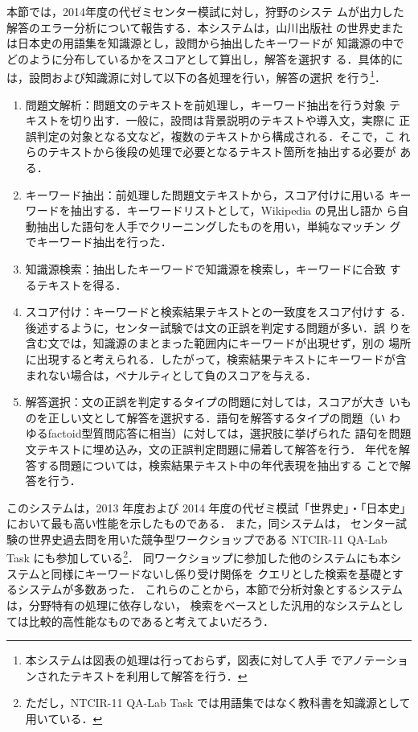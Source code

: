 \documentclass[japanese]{jnlp_1.4b}
\begin{document}
本節では，2014年度の代ゼミセンター模試に対し，狩野\cite{kano2014jsai}のシステ
ムが出力した解答のエラー分析について報告する．本システムは，山川出版社
の世界史または日本史の用語集を知識源とし，設問から抽出したキーワードが
知識源の中でどのように分布しているかをスコアとして算出し，解答を選択す
る．具体的には，設問および知識源に対して以下の各処理を行い，解答の選択
を行う\footnote{本システムは図表の処理は行っておらず，図表に対して人手
  でアノテーションされたテキストを利用して解答を行う．}．
\begin{enumerate}
\item 問題文解析：問題文のテキストを前処理し，キーワード抽出を行う対象
  テキストを切り出す．一般に，設問は背景説明のテキストや導入文，実際に
  正誤判定の対象となる文など，複数のテキストから構成される．そこで，こ
  れらのテキストから後段の処理で必要となるテキスト箇所を抽出する必要が
  ある．
\item キーワード抽出：前処理した問題文テキストから，スコア付けに用いる
  キーワードを抽出する．キーワードリストとして，Wikipedia の見出し語か
  ら自動抽出した語句を人手でクリーニングしたものを用い，単純なマッチン
  グでキーワード抽出を行った．
\item 知識源検索：抽出したキーワードで知識源を検索し，キーワードに合致
  するテキストを得る．
\item スコア付け：キーワードと検索結果テキストとの一致度をスコア付けす
  る．後述するように，センター試験では文の正誤を判定する問題が多い．誤
  りを含む文では，知識源のまとまった範囲内にキーワードが出現せず，別の
  場所に出現すると考えられる．したがって，検索結果テキストにキーワードが含
  まれない場合は，ペナルティとして負のスコアを与える．
\item 解答選択：文の正誤を判定するタイプの問題に対しては，スコアが大き
  いものを正しい文として解答を選択する．語句を解答するタイプの問題（い
    わゆるfactoid型質問応答に相当）に対しては，選択肢に挙げられた
  語句を問題文テキストに埋め込み，文の正誤判定問題に帰着して解答を行う．
  年代を解答する問題については，検索結果テキスト中の年代表現を抽出する
  ことで解答を行う．
\end{enumerate}

このシステムは，2013 年度および 2014 年度の代ゼミ模試「世界史」・「日本史」において最も高い性能を示したものである．
また，同システムは，
センター試験の世界史過去問を用いた競争型ワークショップである
NTCIR-11 QA-Lab Task \cite{Shibuki2014} にも参加している\footnote{
    ただし，NTCIR-11 QA-Lab Task では用語集ではなく教科書を知識源として用いている．}．
同ワークショップに参加した他のシステムにも本システムと同様にキーワードないし係り受け関係を
クエリとした検索を基礎とするシステムが多数あった．
これらのことから，本節で分析対象とするシステムは，分野特有の処理に依存しない，
検索をベースとした汎用的なシステムとしては比較的高性能なものであると考えてよいだろう．
\end{document}
